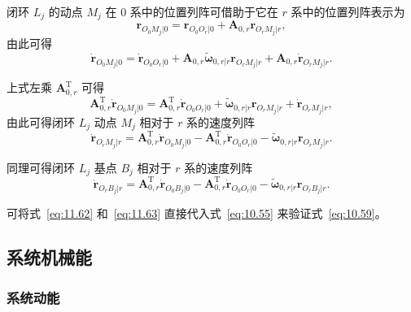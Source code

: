 闭环 $L_j$ 的动点 $M_j$ 在 $0$ 系中的位置列阵可借助于它在 $r$ 系中的位置列阵表示为
\begin{equation}\label{eq:11.59}
\boldsymbol{r}_{O_0M_j|0} = \boldsymbol{r}_{O_0O_r|0} + \boldsymbol{A}_{0,r} \boldsymbol{r}_{O_rM_j|r},
\end{equation}
由此可得
\begin{equation}\label{eq:11.60}
\dot{\boldsymbol{r}}_{O_0M_j|0} = \dot{\boldsymbol{r}}_{O_0O_r|0} + \boldsymbol{A}_{0,r} \tilde{\boldsymbol{\omega}}_{0,r|r} \boldsymbol{r}_{O_rM_j|r} + \boldsymbol{A}_{0,r} \dot{\boldsymbol{r}}_{O_rM_j|r}.
\end{equation}

上式左乘 $\boldsymbol{A}_{0,r}^{\mathrm{T}}$ 可得
\begin{equation}\label{eq:11.61}
\boldsymbol{A}_{0,r}^{\mathrm{T}} \dot{\boldsymbol{r}}_{O_0M_j|0} = \boldsymbol{A}_{0,r}^{\mathrm{T}} \dot{\boldsymbol{r}}_{O_0O_r|0} + \tilde{\boldsymbol{\omega}}_{0,r|r} \boldsymbol{r}_{O_rM_j|r} + \dot{\boldsymbol{r}}_{O_rM_j|r},
\end{equation}
由此可得闭环 $L_j$ 动点 $M_j$ 相对于 $r$ 系的速度列阵
\begin{equation}\label{eq:11.62}
\dot{\boldsymbol{r}}_{O_rM_j|r} = \boldsymbol{A}_{0,r}^{\mathrm{T}} \dot{\boldsymbol{r}}_{O_0M_j|0} - \boldsymbol{A}_{0,r}^{\mathrm{T}} \dot{\boldsymbol{r}}_{O_0O_r|0} - \tilde{\boldsymbol{\omega}}_{0,r|r} \boldsymbol{r}_{O_rM_j|r}.
\end{equation}

同理可得闭环 $L_j$ 基点 $B_j$ 相对于 $r$ 系的速度列阵
\begin{equation}\label{eq:11.63}
\dot{\boldsymbol{r}}_{O_rB_j|r} = \boldsymbol{A}_{0,r}^{\mathrm{T}} \dot{\boldsymbol{r}}_{O_0B_j|0} - \boldsymbol{A}_{0,r}^{\mathrm{T}} \dot{\boldsymbol{r}}_{O_0O_r|0} - \tilde{\boldsymbol{\omega}}_{0,r|r} \boldsymbol{r}_{O_rB_j|r}.
\end{equation}

可将式~\eqref{eq:11.62} 和~\eqref{eq:11.63} 直接代入式~\eqref{eq:10.55} 来验证式~\eqref{eq:10.59}。

\subsection{系统机械能}

\subsubsection{系统动能}

